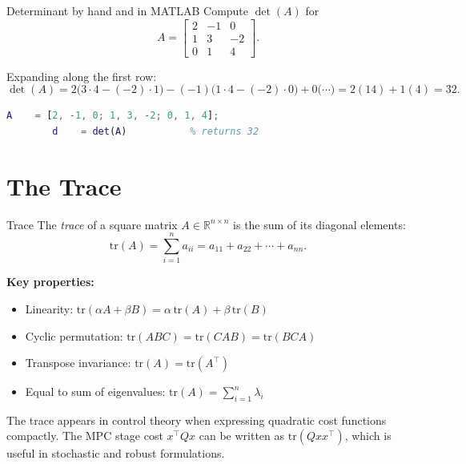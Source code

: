\begin{examplebox}{Determinant by hand and in MATLAB}
	Compute $\det(A)$ for
	\[
	A = \begin{bmatrix} 2 & -1 & 0 \\ 1 & 3 & -2 \\ 0 & 1 & 4 \end{bmatrix}.
	\]
	
	\solution
	Expanding along the first row:
	\[
	\det(A) = 2\bigl(3\cdot4 - (-2)\cdot1\bigr)
	- (-1)\bigl(1\cdot4 - (-2)\cdot0\bigr)
	+ 0\bigl(\cdots\bigr)
	= 2(14) + 1(4) = 32.
	\]
	
	\begin{lstlisting}[language=Matlab]
		A    = [2, -1, 0; 1, 3, -2; 0, 1, 4];
		d    = det(A)           % returns 32
	\end{lstlisting}
\end{examplebox}

\section{The Trace}
\label{sec:app_trace}

\begin{defnbox}{Trace}
	The \emph{trace} of a square matrix $A \in \mathbb{R}^{n\times n}$
	is the sum of its diagonal elements:
	\[
	\mathrm{tr}(A) = \sum_{i=1}^{n} a_{ii} = a_{11} + a_{22} + \cdots + a_{nn}.
	\]
\end{defnbox}

\textbf{Key properties:}
\begin{itemize}[noitemsep]
	\item Linearity: $\mathrm{tr}(\alpha A + \beta B) = \alpha\,\mathrm{tr}(A) + \beta\,\mathrm{tr}(B)$
	\item Cyclic permutation: $\mathrm{tr}(ABC) = \mathrm{tr}(CAB) = \mathrm{tr}(BCA)$
	\item Transpose invariance: $\mathrm{tr}(A) = \mathrm{tr}(A^\top)$
	\item Equal to sum of eigenvalues: $\mathrm{tr}(A) = \sum_{i=1}^n \lambda_i$
\end{itemize}

The trace appears in control theory when expressing quadratic cost
functions compactly.  The MPC stage cost
${x}^\top Q {x}$ can be written as
$\mathrm{tr}(Q{x}{x}^\top)$, which is useful in
stochastic and robust formulations.

